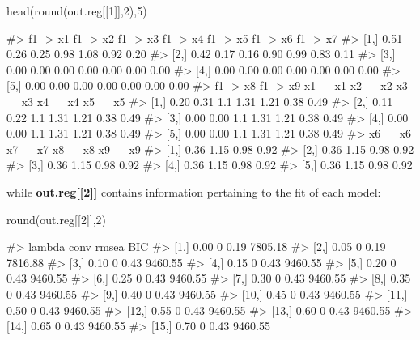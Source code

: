 \begin{Schunk}
\begin{Sinput}
head(round(out.reg[[1]],2),5)
\end{Sinput}
\begin{Soutput}
#>      f1 -> x1 f1 -> x2 f1 -> x3 f1 -> x4 f1 -> x5 f1 -> x6 f1 -> x7
#> [1,]     0.51     0.26     0.25     0.98     1.08     0.92     0.20
#> [2,]     0.42     0.17     0.16     0.90     0.99     0.83     0.11
#> [3,]     0.00     0.00     0.00     0.00     0.00     0.00     0.00
#> [4,]     0.00     0.00     0.00     0.00     0.00     0.00     0.00
#> [5,]     0.00     0.00     0.00     0.00     0.00     0.00     0.00
#>      f1 -> x8 f1 -> x9 x1 ~~ x1 x2 ~~ x2 x3 ~~ x3 x4 ~~ x4 x5 ~~ x5
#> [1,]     0.20     0.31      1.1     1.31     1.21     0.38     0.49
#> [2,]     0.11     0.22      1.1     1.31     1.21     0.38     0.49
#> [3,]     0.00     0.00      1.1     1.31     1.21     0.38     0.49
#> [4,]     0.00     0.00      1.1     1.31     1.21     0.38     0.49
#> [5,]     0.00     0.00      1.1     1.31     1.21     0.38     0.49
#>      x6 ~~ x6 x7 ~~ x7 x8 ~~ x8 x9 ~~ x9
#> [1,]     0.36     1.15     0.98     0.92
#> [2,]     0.36     1.15     0.98     0.92
#> [3,]     0.36     1.15     0.98     0.92
#> [4,]     0.36     1.15     0.98     0.92
#> [5,]     0.36     1.15     0.98     0.92
\end{Soutput}
\end{Schunk}

while \textbf{out.reg[[2]]} contains information pertaining to the fit
of each model:

\begin{Schunk}
\begin{Sinput}
round(out.reg[[2]],2)
\end{Sinput}
\begin{Soutput}
#>       lambda conv rmsea     BIC
#>  [1,]   0.00    0  0.19 7805.18
#>  [2,]   0.05    0  0.19 7816.88
#>  [3,]   0.10    0  0.43 9460.55
#>  [4,]   0.15    0  0.43 9460.55
#>  [5,]   0.20    0  0.43 9460.55
#>  [6,]   0.25    0  0.43 9460.55
#>  [7,]   0.30    0  0.43 9460.55
#>  [8,]   0.35    0  0.43 9460.55
#>  [9,]   0.40    0  0.43 9460.55
#> [10,]   0.45    0  0.43 9460.55
#> [11,]   0.50    0  0.43 9460.55
#> [12,]   0.55    0  0.43 9460.55
#> [13,]   0.60    0  0.43 9460.55
#> [14,]   0.65    0  0.43 9460.55
#> [15,]   0.70    0  0.43 9460.55
\end{Soutput}
\end{Schunk}

